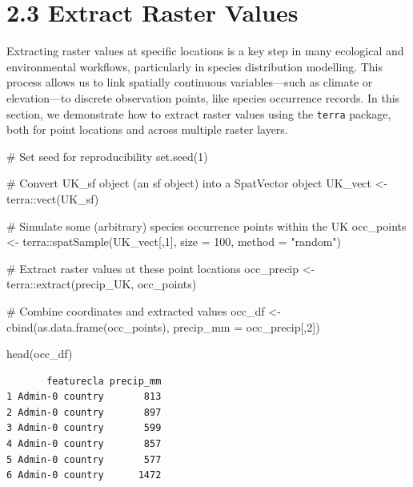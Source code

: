 \documentclass[
]{book}
\newenvironment{Shaded}{\begin{snugshade}}{\end{snugshade}}
\newcommand{\AttributeTok}[1]{\textcolor[rgb]{0.40,0.45,0.13}{#1}}
\newcommand{\CommentTok}[1]{\textcolor[rgb]{0.37,0.37,0.37}{#1}}
\newcommand{\DecValTok}[1]{\textcolor[rgb]{0.68,0.00,0.00}{#1}}
\newcommand{\FunctionTok}[1]{\textcolor[rgb]{0.28,0.35,0.67}{#1}}
\newcommand{\NormalTok}[1]{\textcolor[rgb]{0.00,0.23,0.31}{#1}}
\newcommand{\OtherTok}[1]{\textcolor[rgb]{0.00,0.23,0.31}{#1}}
\newcommand{\SpecialCharTok}[1]{\textcolor[rgb]{0.37,0.37,0.37}{#1}}
\newcommand{\StringTok}[1]{\textcolor[rgb]{0.13,0.47,0.30}{#1}}
\begin{document}
\section{2.3 Extract Raster Values}\label{extract-raster-values}

Extracting raster values at specific locations is a key step in many
ecological and environmental workflows, particularly in species
distribution modelling. This process allows us to link spatially
continuous variables---such as climate or elevation---to discrete
observation points, like species occurrence records. In this section, we
demonstrate how to extract raster values using the \texttt{terra}
package, both for point locations and across multiple raster layers.

\begin{Shaded}
\begin{Highlighting}[]
\CommentTok{\# Set seed for reproducibility}
\FunctionTok{set.seed}\NormalTok{(}\DecValTok{1}\NormalTok{)}

\CommentTok{\# Convert UK\_sf object (an sf object) into a SpatVector object}
\NormalTok{UK\_vect }\OtherTok{\textless{}{-}}\NormalTok{ terra}\SpecialCharTok{::}\FunctionTok{vect}\NormalTok{(UK\_sf)}

\CommentTok{\# Simulate some (arbitrary) species occurrence points within the UK}
\NormalTok{occ\_points }\OtherTok{\textless{}{-}}\NormalTok{ terra}\SpecialCharTok{::}\FunctionTok{spatSample}\NormalTok{(UK\_vect[,}\DecValTok{1}\NormalTok{], }\AttributeTok{size =} \DecValTok{100}\NormalTok{, }\AttributeTok{method =} \StringTok{"random"}\NormalTok{)}

\CommentTok{\# Extract raster values at these point locations}
\NormalTok{occ\_precip }\OtherTok{\textless{}{-}}\NormalTok{ terra}\SpecialCharTok{::}\FunctionTok{extract}\NormalTok{(precip\_UK, occ\_points)}

\CommentTok{\# Combine coordinates and extracted values}
\NormalTok{occ\_df }\OtherTok{\textless{}{-}} \FunctionTok{cbind}\NormalTok{(}\FunctionTok{as.data.frame}\NormalTok{(occ\_points), }\AttributeTok{precip\_mm =}\NormalTok{ occ\_precip[,}\DecValTok{2}\NormalTok{])}

\FunctionTok{head}\NormalTok{(occ\_df)}
\end{Highlighting}
\end{Shaded}

\begin{verbatim}
       featurecla precip_mm
1 Admin-0 country       813
2 Admin-0 country       897
3 Admin-0 country       599
4 Admin-0 country       857
5 Admin-0 country       577
6 Admin-0 country      1472
\end{verbatim}
\end{document}
